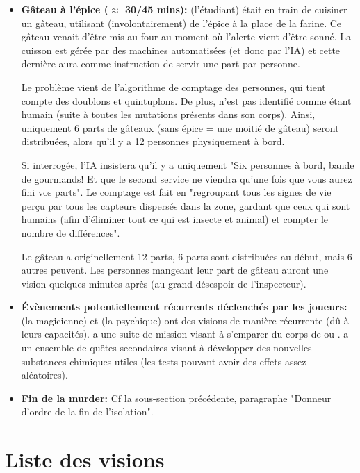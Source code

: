 {\begin{itemize}
		
		\item \textbf{Gâteau à l'épice ($\approx$ 30/45 mins):} \nmPlayerIII (l'étudiant) était en train de cuisiner un gâteau, utilisant (involontairement) de l'épice à la place de la farine. Ce gâteau venait d'être mis au four au moment où l'alerte vient d'être sonné. La cuisson est gérée par des machines automatisées (et donc par l'IA) et cette dernière aura comme instruction de servir une part par personne.
		
		\par Le problème vient de l'algorithme de comptage des personnes, qui tient compte des doublons et quintuplons. De plus, \nmPlayerX n'est pas identifié comme étant humain (suite à toutes les mutations présents dans son corps). Ainsi, uniquement 6 parts de gâteaux (sans épice = une moitié de gâteau) seront distribuées, alors qu'il y a 12 personnes physiquement à bord.
		
		\par Si interrogée, l'IA insistera qu'il y a uniquement "Six personnes à bord, bande de gourmands! Et que le second service ne viendra qu'une fois que vous aurez fini vos parts". Le comptage est fait en "regroupant tous les signes de vie perçu par tous les capteurs dispersés dans la zone, gardant que ceux qui sont humains (afin d'éliminer tout ce qui est insecte et animal) et compter le nombre de différences". 
		
		\par Le gâteau a originellement 12 parts, 6 parts sont distribuées au début, mais 6 autres peuvent. Les personnes mangeant leur part de gâteau auront une vision quelques minutes après (au grand désespoir de l'inspecteur).
		
		
		\item \textbf{Évènements potentiellement récurrents déclenchés par les joueurs:} \nmPlayerVI (la magicienne) et \nmPlayerIX (la psychique) ont des visions de manière récurrente (dû à leurs capacités). \nmPlayerI a une suite de mission visant à s'emparer du corps de \nmPlayerII ou \nmPlayerIII. \nmPlayerXII a un ensemble de quêtes secondaires visant à développer des nouvelles substances chimiques utiles (les tests pouvant avoir des effets assez aléatoires).
		
		\item \textbf{Fin de la murder:} Cf la sous-section précédente, paragraphe "Donneur d'ordre de la fin de l'isolation".
	\end{itemize}
	
	
	\section{Liste des visions}
	
}
